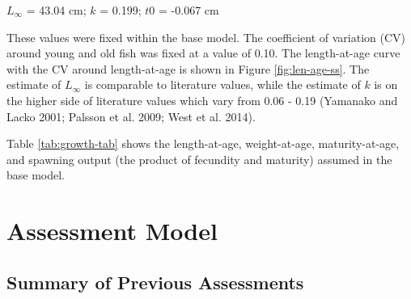 \documentclass[11pt,
  english,
  letterpaper,
]{article}
\begin{document}
\leavevmode\tagmcend\tagstructend\par

\begin{centering}

$L_{\infty}$ = 43.04 cm; $k$ = 0.199; $t0$ = -0.067 cm  

\end{centering}


These values were fixed within the base model. The coefficient of variation (CV) around young and old fish was fixed at a value of 0.10. The length-at-age curve with the CV around length-at-age is shown in Figure \ref{fig:len-age-ss}. The estimate of {\(L_{\infty}\)\leavevmode\tagmcend\tagstructend} is comparable to literature values, while the estimate of {\(k\)\leavevmode\tagmcend\tagstructend} is on the higher side of literature values which vary from 0.06 - 0.19 {(Yamanako and Lacko 2001; Palsson et al. 2009; West et al. 2014)\leavevmode\tagmcend\tagstructend}.

\leavevmode\tagmcend\tagstructend\par


Table \ref{tab:growth-tab} shows the length-at-age, weight-at-age, maturity-at-age, and spawning output (the product of fecundity and maturity) assumed in the base model.

\leavevmode\tagmcend\tagstructend\par


\hypertarget{assessment-model}{%
\section{Assessment Model}\label{assessment-model}}

\leavevmode\tagmcend\tagstructend


\hypertarget{summary-of-previous-assessments}{%
\subsection{Summary of Previous Assessments}\label{summary-of-previous-assessments}}
\end{document}
